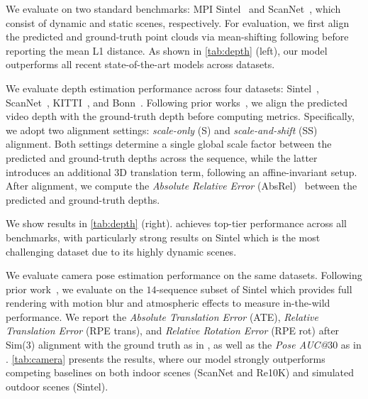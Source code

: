 We evaluate on two standard benchmarks: MPI Sintel~\cite{bulter2012sintel} and ScanNet~\cite{scannet}, which consist of dynamic and static scenes, respectively.
For evaluation, we first align the predicted and ground-truth point clouds via mean-shifting following \citet{li2025megasam} before reporting the mean L1 distance.
As shown in \cref{tab:depth} (left), our model outperforms all recent state-of-the-art models across datasets.



We evaluate depth estimation performance across four datasets: Sintel~\cite{bulter2012sintel},
ScanNet~\cite{scannet},
KITTI~\cite{kitti2013}, and
Bonn~\cite{Bonn2019}.
Following prior works~\cite{li2025megasam, wang2025cut3r}, we align the predicted video depth with the ground-truth depth before computing metrics.
Specifically, we adopt two alignment settings:
\emph{scale-only} (S) and \emph{scale-and-shift} (SS) alignment.
Both settings determine a single global scale factor between the predicted and ground-truth depths across the sequence, while the latter introduces an additional 3D translation term, following an affine-invariant setup.
After alignment, we compute the \emph{Absolute Relative Error} (AbsRel)~\cite{AbsRelErr} between the predicted and ground-truth depths.




We show results in \cref{tab:depth} (right).
\name achieves top-tier performance across all benchmarks, with particularly strong results on Sintel which is the most challenging dataset due to its highly dynamic scenes.



We evaluate camera pose estimation performance on the same datasets.
Following prior work~\cite{wang2025cut3r, jiang2025geo4d}, we evaluate on the $14$-sequence subset of Sintel which provides full rendering with motion blur and atmospheric effects to measure in-the-wild performance.
We report the \emph{Absolute Translation Error} (ATE), \emph{Relative Translation Error} (RPE trans), and \emph{Relative Rotation Error} (RPE rot) after Sim(3) alignment with the ground truth as in \cite{zhang2024monst3r, wang2025cut3r, wang2025pi}, as well as the \emph{Pose AUC@$30$} as in \cite{wang2025vggt}.
\cref{tab:camera} presents the results, where our model strongly outperforms competing baselines on both indoor scenes (ScanNet and Re10K) and simulated outdoor scenes (Sintel).




